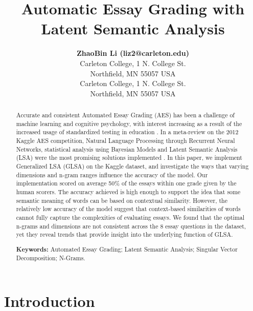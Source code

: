 \documentclass[10pt,letterpaper]{article}
\title{Automatic Essay Grading with Latent Semantic Analysis}
\author{{\large \bf ZhaoBin Li
(liz2@carleton.edu)} \\
 Carleton College, 1 N. College St.
 \\
 Northfield, MN 55057 USA
 \AND {\large \bf Owen Szafran
 (szafrano@carleton.edu)} \\
 Carleton College, 1 N. College St.
 \\
 Northfield, MN 55057 USA}
\begin{document}
\maketitle

\begin{abstract}
Accurate and consistent Automated Essay Grading (AES) has been a challenge of machine learning and cognitive psychology, with interest increasing as a result of the increased usage of standardized testing in education \cite{shermis2014state}. In a meta-review on the 2012 Kaggle AES competition, Natural Language Processing through Recurrent Neural Networks, statistical analysis using Bayesian Models and Latent Semantic Analysis (LSA) were the most promising solutions implemented \cite{shermis2014state}. In this paper, we implement Generalized LSA (GLSA) on the Kaggle dataset, and investigate the ways that varying dimensions and n-gram ranges influence the accuracy of the model. Our implementation scored on average 50\% of the essays within one grade given by the human scorers. The accuracy achieved is high enough to support the idea that some semantic meaning of words can be based on contextual similarity. However, the relatively low accuracy of the model suggest that context-based similarities of words cannot fully capture the complexities of evaluating essays. We found that the optimal n-grams and dimensions are not consistent across the 8 essay questions in the dataset, yet they reveal trends that provide insight into the underlying function of GLSA. 

\textbf{Keywords:} 
Automated Essay Grading; Latent Semantic Analysis; Singular Vector Decomposition; N-Grams.
\end{abstract}

\section{Introduction}
\end{document}
